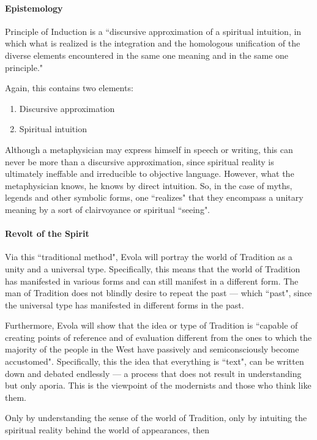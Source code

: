 \paragraph{Epistemology}
Principle of Induction is a ``discursive approximation of a spiritual intuition, in which what is realized is the integration and the homologous unification of the diverse elements encountered in the same one meaning and in the same one principle." 

Again, this contains two elements:

\begin{enumerate}
\item Discursive approximation 
\item Spiritual intuition 
\end{enumerate}
Although a metaphysician may express himself in speech or writing, this can never be more than a discursive approximation, since spiritual reality is ultimately ineffable and irreducible to objective language. However, what the metaphysician knows, he knows by direct intuition. So, in the case of myths, legends and other symbolic forms, one ``realizes" that they encompass a unitary meaning by a sort of clairvoyance or spiritual ``seeing". 

\paragraph{Revolt of the Spirit}
Via this ``traditional method", Evola will portray the world of Tradition as a unity and a universal type. Specifically, this means that the world of Tradition has manifested in various forms and can still manifest in a different form. The man of Tradition does not blindly desire to repeat the past — which ``past", since the universal type has manifested in different forms in the past. 

Furthermore, Evola will show that the idea or type of Tradition is ``capable of creating points of reference and of evaluation different from the ones to which the majority of the people in the West have passively and semiconsciously become accustomed". Specifically, this the idea that everything is ``text", can be written down and debated endlessly — a process that does not result in understanding but only aporia. This is the viewpoint of the modernists and those who think like them. 

Only by understanding the sense of the world of Tradition, only by intuiting the spiritual reality behind the world of appearances, then

